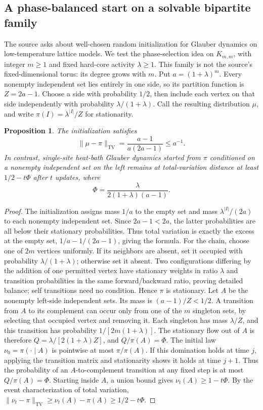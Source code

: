 \documentclass[11pt]{article}
\newtheorem{proposition}{Proposition}
\begin{document}
\subsection{A phase-balanced start on a solvable bipartite family}
The source asks about well-chosen random initialization for Glauber dynamics on low-temperature lattice models. We test the phase-selection idea on $K_{m,m}$, with integer $m\ge1$ and fixed hard-core activity $\lambda\ge1$. This family is not the source's fixed-dimensional torus: its degree grows with $m$. Put $a=(1+\lambda)^m$. Every nonempty independent set lies entirely in one side, so its partition function is $Z=2a-1$.
Choose a side with probability $1/2$, then include each vertex on that side independently with probability $\lambda/(1+\lambda)$. Call the resulting distribution $\mu$, and write $\pi(I)=\lambda^{|I|}/Z$ for stationarity.
\begin{proposition}
The initialization satisfies
\[
\|\mu-\pi\|_{\mathrm{TV}}=\frac{a-1}{a(2a-1)}\le a^{-1}.
\]
In contrast, single-site heat-bath Glauber dynamics started from $\pi$ conditioned on a nonempty independent set on the left remains at total-variation distance at least $1/2-t\Phi$ after $t$ updates, where
\[
\Phi=\frac{\lambda}{2(1+\lambda)(a-1)}.
\]
\end{proposition}
\begin{proof}
The initialization assigns mass $1/a$ to the empty set and mass $\lambda^{|I|}/(2a)$ to each nonempty independent set. Since $2a-1<2a$, the latter probabilities are all below their stationary probabilities. Thus total variation is exactly the excess at the empty set, $1/a-1/(2a-1)$, giving the formula.
For the chain, choose one of $2m$ vertices uniformly. If its neighbors are absent, set it occupied with probability $\lambda/(1+\lambda)$; otherwise set it absent. Two configurations differing by the addition of one permitted vertex have stationary weights in ratio $\lambda$ and transition probabilities in the same forward/backward ratio, proving detailed balance; self transitions need no condition. Hence $\pi$ is stationary.
Let $A$ be the nonempty left-side independent sets. Its mass is $(a-1)/Z<1/2$. A transition from $A$ to its complement can occur only from one of the $m$ singleton sets, by selecting that occupied vertex and removing it. Each singleton has mass $\lambda/Z$, and this transition has probability $1/[2m(1+\lambda)]$. The stationary flow out of $A$ is therefore $Q=\lambda/[2(1+\lambda)Z]$, and $Q/\pi(A)=\Phi$.
The initial law $\nu_0=\pi(\cdot\mid A)$ is pointwise at most $\pi/\pi(A)$. If this domination holds at time $j$, applying the transition matrix and stationarity shows it holds at time $j+1$. Thus the probability of an $A$-to-complement transition at any fixed step is at most $Q/\pi(A)=\Phi$. Starting inside $A$, a union bound gives $\nu_t(A)\ge1-t\Phi$. By the event characterization of total variation, $\|\nu_t-\pi\|_{\mathrm{TV}}\ge\nu_t(A)-\pi(A)\ge1/2-t\Phi$.
\end{proof}
\end{document}
